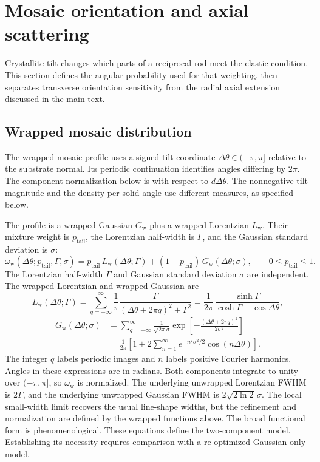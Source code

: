\section{Mosaic orientation and axial scattering}
\label{sec:si_mosaic}

Crystallite tilt changes which parts of a reciprocal rod meet the elastic condition. This section defines the angular probability used for that weighting, then separates transverse orientation sensitivity from the radial axial extension discussed in the main text.

\subsection{Wrapped mosaic distribution}
\label{subsec:si_wrapped_mosaic}

The wrapped mosaic profile uses a signed tilt coordinate $\Delta\theta\in(-\pi,\pi]$ relative to the substrate normal. Its periodic continuation identifies angles differing by $2\pi$. The component normalization below is with respect to $d\Delta\theta$. The nonnegative tilt magnitude and the density per solid angle use different measures, as specified below.

The profile is a wrapped Gaussian $G_{\mathrm w}$ plus a wrapped Lorentzian $L_{\mathrm w}$. Their mixture weight is $p_{\mathrm{tail}}$, the Lorentzian half-width is $\Gamma$, and the Gaussian standard deviation is $\sigma$:
\[
  \omega_{\mathrm w}(\Delta\theta;p_{\mathrm{tail}},\Gamma,\sigma)
  =p_{\mathrm{tail}}\,L_{\mathrm w}(\Delta\theta;\Gamma)
  +(1-p_{\mathrm{tail}})\,G_{\mathrm w}(\Delta\theta;\sigma),
  \qquad 0\le p_{\mathrm{tail}} \le 1.
\]
The Lorentzian half-width $\Gamma$ and Gaussian standard deviation $\sigma$ are independent. The wrapped Lorentzian and wrapped Gaussian are
\[
  L_{\mathrm w}(\Delta\theta;\Gamma)=
  \sum_{q=-\infty}^{\infty}\frac{1}{\pi}\frac{\Gamma}{(\Delta\theta+2\pi q)^2+\Gamma^2}
  =\frac{1}{2\pi}\,\frac{\sinh\Gamma}{\cosh\Gamma-\cos\Delta\theta},
\]
\[
  \begin{aligned}
    G_{\mathrm w}(\Delta\theta;\sigma)
    &= \sum_{q=-\infty}^{\infty}\frac{1}{\sqrt{2\pi}\sigma}
       \exp\!\left[-\frac{(\Delta\theta+2\pi q)^2}{2\sigma^2}\right] \\
    &= \frac{1}{2\pi}\!\left[
         1+2\sum_{n=1}^{\infty}e^{-n^2\sigma^2/2}\cos(n\Delta\theta)
       \right].
  \end{aligned}
\]
The integer $q$ labels periodic images and $n$ labels positive Fourier harmonics. Angles in these expressions are in radians. Both components integrate to unity over $(-\pi,\pi]$, so $\omega_{\mathrm w}$ is normalized. The underlying unwrapped Lorentzian FWHM is $2\Gamma$, and the underlying unwrapped Gaussian FWHM is $2\sqrt{2\ln 2}\,\sigma$. The local small-width limit recovers the usual line-shape widths, but the refinement and normalization are defined by the wrapped functions above. The broad functional form is phenomenological. These equations define the two-component model. Establishing its necessity requires comparison with a re-optimized Gaussian-only model.

